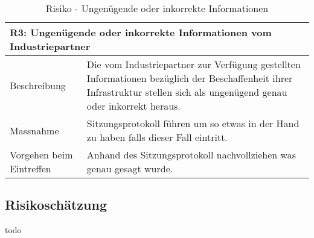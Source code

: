 \begin{table}[H]
\begin{tabularx}{\textwidth}{l|>{\raggedright\arraybackslash}X}
\multicolumn{2}{l}{\textbf{R3: Ungenügende oder inkorrekte Informationen vom Industriepartner}} \\
\hline
Beschreibung & Die vom Industriepartner zur Verfügung gestellten Informationen bezüglich der Beschaffenheit ihrer Infrastruktur stellen sich als ungenügend genau oder inkorrekt heraus.\\
\hline
Massnahme & Sitzungsprotokoll führen um so etwas in der Hand zu haben falls dieser Fall eintritt. \\
\hline
Vorgehen beim Eintreffen & Anhand des Sitzungsprotokoll nachvollziehen was genau gesagt wurde.\\
\end{tabularx}
\caption{Risiko - Ungenügende oder inkorrekte Informationen}
\end{table}

\subsection{Risikoschätzung}
todo
